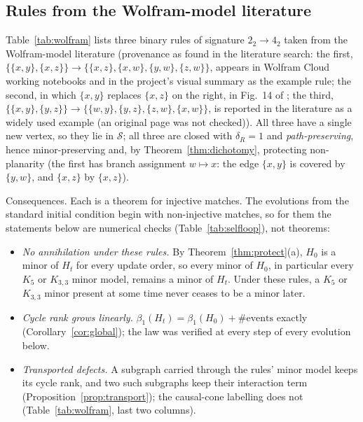 \documentclass[10pt]{article}
\theoremstyle{definition}
\theoremstyle{plain}
\theoremstyle{remark}
\newcommand{\Betti}{\beta_1}
\begin{document}
\subsection{Rules from the Wolfram-model literature}
Table~\ref{tab:wolfram} lists three binary rules of signature $2_2\to4_2$ taken from the Wolfram-model literature (provenance as found in the literature search: the first, $\{\{x,y\},\{x,z\}\}\to\{\{x,z\},\{x,w\},\{y,w\},\{z,w\}\}$, appears in Wolfram Cloud working notebooks and in the project's visual summary as the example rule; the second, in which $\{x,y\}$ replaces $\{x,z\}$ on the right, in Fig.~14 of \citet{gorard2020algorithmic}; the third, $\{\{x,y\},\{y,z\}\}\to\{\{w,y\},\{y,z\},\{z,w\},\{x,w\}\}$, is reported in the literature as a widely used example (an original page was not checked)). All three have a single new vertex, so they lie in $\mathcal S$; all three are closed with $\delta_R=1$ and \emph{path-preserving}, hence minor-preserving and, by Theorem~\ref{thm:dichotomy}, protecting non-planarity (the first has branch assignment $w\mapsto x$: the edge $\{x,y\}$ is covered by $\{y,w\}$, and $\{x,z\}$ by $\{x,z\}$).
\begin{table}[t]\centering\scriptsize
\resizebox{\textwidth}{!}{}
\caption{Three binary Wolfram-model rules ($2_2\to4_2$, one new vertex); the label W3 is not used because the rule so numbered in the archive, $\{\{x,y\}\}\to\{\{x,y\},\{y,z\}\}$ (signature $1_2\to2_2$, path-preserving, $\delta_R=0$), has a one-edge left side, which the lattice code does not match, so it was classified but not run. Lattice runs as in Section~\ref{sec:exp} (2D $8\times8$ and 3D $7\times7\times7$ grids, $K_5$ and $K_{3,3}$ defects, canonical and random order; runs stop when $|E|>15000$, so $t_{\max}$ is small for these edge-doubling rules). Entries: runs satisfying the property / runs (2D, 3D). The cycle-rank law holds in \wolframlaw{} lattice evolutions.}\label{tab:wolfram}
\end{table}
Consequences. Each is a theorem for injective matches. The evolutions from the standard initial condition begin with non-injective matches, so for them the statements below are numerical checks (Table~\ref{tab:selfloop}), not theorems:
\begin{itemize}
\item \emph{No annihilation under these rules.} By Theorem~\ref{thm:protect}(a), $H_0$ is a minor of $H_t$ for every update order, so every minor of $H_0$, in particular every $K_5$ or $K_{3,3}$ minor model, remains a minor of $H_t$. Under these rules, a $K_5$ or $K_{3,3}$ minor present at some time never ceases to be a minor later.
\item \emph{Cycle rank grows linearly.} $\Betti(H_t)=\Betti(H_0)+\#\text{events}$ exactly (Corollary~\ref{cor:global}); the law was verified at every step of every evolution below.
\item \emph{Transported defects.} A subgraph carried through the rules' minor model keeps its cycle rank, and two such subgraphs keep their interaction term (Proposition~\ref{prop:transport}); the causal-cone labelling does not (Table~\ref{tab:wolfram}, last two columns).
\end{itemize}
\end{document}
